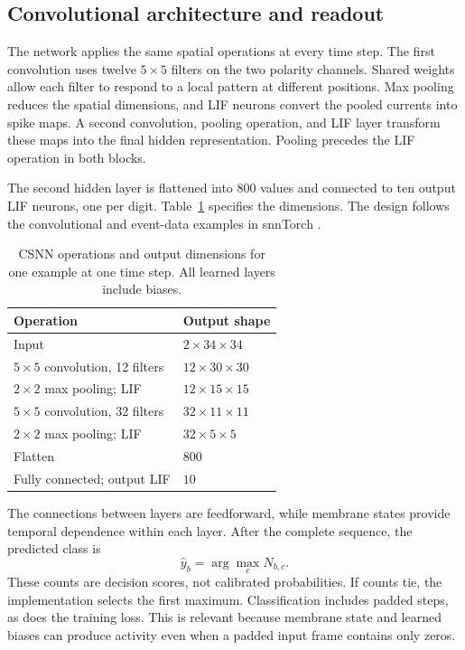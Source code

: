 \subsection{Convolutional architecture and readout}

The network applies the same spatial operations at every time step. The first convolution uses twelve $5\times5$ filters on the two polarity channels. Shared weights allow each filter to respond to a local pattern at different positions. Max pooling reduces the spatial dimensions, and LIF neurons convert the pooled currents into spike maps. A second convolution, pooling operation, and LIF layer transform these maps into the final hidden representation. Pooling precedes the LIF operation in both blocks.

The second hidden layer is flattened into 800 values and connected to ten output LIF neurons, one per digit. Table~\ref{tab:csnn-architecture} specifies the dimensions. The design follows the convolutional and event-data examples in snnTorch \citep{snntorchTutorial6,snntorchTutorial7}.

\begin{table}[tb]
    \centering
    \small
    \caption{CSNN operations and output dimensions for one example at one time step. All learned layers include biases.}
    \label{tab:csnn-architecture}
    \begin{tabular}{@{}ll@{}}
        \toprule
        Operation & Output shape\\
        \midrule
        Input & $2\times34\times34$\\
        $5\times5$ convolution, 12 filters & $12\times30\times30$\\
        $2\times2$ max pooling; LIF & $12\times15\times15$\\
        $5\times5$ convolution, 32 filters & $32\times11\times11$\\
        $2\times2$ max pooling; LIF & $32\times5\times5$\\
        Flatten & $800$\\
        Fully connected; output LIF & $10$\\
        \bottomrule
    \end{tabular}
\end{table}

The connections between layers are feedforward, while membrane states provide temporal dependence within each layer. After the complete sequence, the predicted class is
\begin{equation}
    \hat{y}_b = \arg\max_{c} N_{b,c}.
\end{equation}
These counts are decision scores, not calibrated probabilities. If counts tie, the implementation selects the first maximum. Classification includes padded steps, as does the training loss. This is relevant because membrane state and learned biases can produce activity even when a padded input frame contains only zeros.

